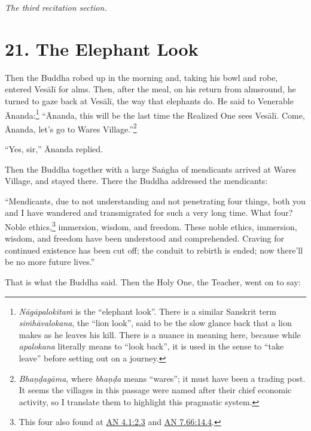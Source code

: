 \documentclass[12pt,openany]{book}%
\newcommand*{\scendsection}[1]{\begin{Center}\begin{small}\textit{#1}\end{small}\end{Center}\addvspace{1em}}
\begin{document}
\scendsection{The third recitation section. }

\section*{21. The Elephant Look }

Then the Buddha robed up in the morning and, taking his bowl and robe, entered \textsanskrit{Vesālī} for alms. Then, after the meal, on his return from almsround, he turned to gaze back at \textsanskrit{Vesālī}, the way that elephants do. He said to Venerable Ānanda:\footnote{\textit{\textsanskrit{Nāgāpalokitaṁ}} is the “elephant look”. There is a similar Sanskrit term \textit{\textsanskrit{siṁhāvalokana}}, the “lion look”, said to be the slow glance back that a lion makes as he leaves his kill. There is a nuance in meaning here, because while \textit{apalokana} literally means to “look back”, it is used in the sense to “take leave” before setting out on a journey. } “Ānanda, this will be the last time the Realized One sees \textsanskrit{Vesālī}. Come, Ānanda, let’s go to Wares Village.”\footnote{\textit{\textsanskrit{Bhaṇḍagāma}}, where \textit{\textsanskrit{bhaṇḍa}} means “wares”; it must have been a trading post. It seems the villages in this passage were named after their chief economic activity, so I translate them to highlight this pragmatic system. } 

“Yes, sir,” Ānanda replied. 

Then the Buddha together with a large \textsanskrit{Saṅgha} of mendicants arrived at Wares Village, and stayed there. There the Buddha addressed the mendicants: 

“Mendicants, due to not understanding and not penetrating four things, both you and I have wandered and transmigrated for such a very long time. What four? Noble ethics,\footnote{This four also found at \href{https://suttacentral.net/an4.1/en/sujato\#2.3}{AN 4.1:2.3} and \href{https://suttacentral.net/an7.66/en/sujato\#14.4}{AN 7.66:14.4}. } immersion, wisdom, and freedom. These noble ethics, immersion, wisdom, and freedom have been understood and comprehended. Craving for continued existence has been cut off; the conduit to rebirth is ended; now there’ll be no more future lives.” 

That is what the Buddha said. Then the Holy One, the Teacher, went on to say: 
\end{document}
